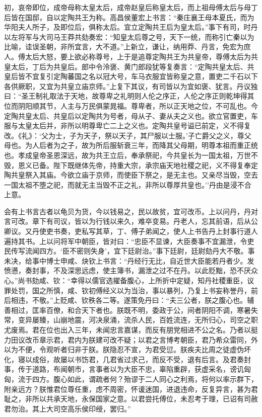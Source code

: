 \documentclass[]{article}
\begin{document}
初，哀帝即位，成帝母称太皇太后，成帝赵皇后称皇太后，而上祖母傅太后与母丁后皆在国邸，自以定陶共王为称。高昌侯董宏上书言：``秦庄襄王母本夏氏，而为华阳夫人所子，及即位后，俱称太后。宜立定陶共王后为皇太后。''事下有司，时丹以左将军与大司马王莽共劾奏宏：``知皇太后尊之号，天下一统，而称引亡秦以为比喻，诖误圣朝，非所宜言，大不道。''上新立，谦让，纳用莽、丹言，免宏为庶人。傅太后大怒，要上欲必称尊号，上于是追尊定陶共王为共皇帝，尊傅太后为共皇太后，丁后为共皇后。郎中令泠褒、黄门郎段犹等复奏言：``定陶共皇太后、共皇后皆不宜复引定陶蕃国之名以冠大号，车马衣服宜皆称皇之意，置吏二千石以下各供厥职，又宜为共皇立庙京师。''上复下其议，有司皆以为宜如褒、犹言。丹议独曰：``圣王制礼取法于天地，故尊卑之礼明则人伦之序正，人伦之序正则乾坤得其位而阴阳顺其节，人主与万民俱蒙晁福。尊卑者，所以正天地之位，不可乱也。今定陶共皇太后、共皇后以定陶共为号者，母从子、妻从夫之义也。欲立官置吏，车服与太皇太后并，非所以明尊卑亡二上之义也。定陶共皇号谥已前定，义不得复改。《礼》：`父为士，子为天子，祭以天子，其尸服以士服。'子亡爵父之义，尊父母也。为人后者为之子，故为所后服斩衰三年，而降其父母期，明尊本祖而重正统也。孝成皇帝圣恩深远，故为共王立后，奉承祭祀，今共皇长为一国太祖，万世不毁，恩义已备。陛下既继体先帝，持重大宗，承宗庙天地社稷之祀，义不得复奉定陶共皇祭入其庙。今欲立庙于京师，而使臣下祭之，是无主也。又亲尽当毁，空去一国太祖不堕之祀，而就无主当毁不正之礼，非所以尊厚共皇也。''丹由是浸不合上意。

会有上书言古者以龟贝为货，今以钱易之，民以故贫，宜可改币。上以问丹，丹对言可改。章下有司议，皆以为行钱以来久，难卒变易。丹老人，忘其前语，后从公卿议。又丹使吏书奏，吏私写其草，丁、傅子弟闻之，使人上书告丹上封事行道人遍持其书。上以问将军中朝臣，皆对曰：``忠臣不显谏，大臣奏事不宜漏泄，令吏民传写流闻四方。`臣不密则失身'，宜下廷尉治。''事下廷尉，廷尉劾丹大不敬。事未决，给事中博士申咸、炔钦上书言：``丹经行无比，自近世大臣能若丹者少。发愤懑，奏封事，不及深思远虑，使主簿书，漏泄之过不在丹。以此贬黜，恐不厌众心。''尚书劾咸、钦：``幸得以儒官选擢备腹心，上所折中定疑，知丹社稷重臣，议罪处罚，国之所慎，咸、钦初傅经义以为当治，事以暴列，乃复上书妄称誉丹，前后相违，不敬。''上贬咸、钦秩各二等。遂策免丹曰：``夫三公者，朕之腹心也。辅善相过，匡率百僚，和合天下者也。朕既不明，委政于公，间者阴阳不调，寒暑失常，变异屡臻，山崩地震，河决泉涌，流杀人民，百姓流连，无所归心，司空之职尤废焉。君在位也出入三年，未闻忠言嘉谋，而反有朋党相进不公之名。乃者以挺力田议改币章示君，君内为朕建可改不疑；以君之言博考朝臣，君乃希众雷同，外以为不便，令观听者归非于朕。朕隐忍不宣，为君受愆。朕疾夫比周之徒虚伪坏化，寝以成俗，故屡以书饬君，几君省过求己，而反不受，退有后言。及君奏封事，传于道路，布闻朝市，言事者以为大臣不忠，辜陷重辟，获虚采名，谤讥匈匈，流于四方。腹心如此，谓疏者何？殆谬于二人同心之利焉，将何以率示群下，附亲远方？朕惟君位尊任重，虑不周密，怀谖迷国，进退违命，反复异言，甚为君耻之，非所以共承天地，永保国家之意。以君尝托傅位，未忍考于理，已诏有司赦君勿治。其上大司空高乐侯印绶，罢归。''
\end{document}
